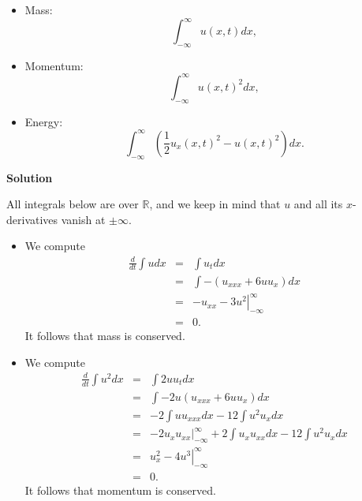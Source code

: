 \documentclass{article}
\begin{document}
\begin{enumerate}
\begin{itemize}
\item Mass:
\[\int_{-\infty}^{\infty} u(x,t) dx,\]

\item Momentum:
\[\int_{-\infty}^{\infty} u(x,t)^2 dx,\]

\item Energy:
\[\int_{-\infty}^{\infty} \left( \frac{1}{2} u_x(x,t)^2 - u(x,t)^2 \right) dx.\]

\end{itemize}

{\bf Solution}

All integrals below are over \(\mathbb{R}\), and we keep in mind that \(u\) and all its \(x\)-derivatives vanish at \(\pm \infty\).

\begin{itemize}
\item We compute
\begin{eqnarray*}
\frac{d}{dt} \int u dx
& = & \int u_t dx \\
& = & \int -\left( u_{xxx} + 6 u u_x \right) dx \\
& = & \left. -u_{xx} - 3 u^2 \right|_{-\infty}^{\infty} \\
& = & 0.
\end{eqnarray*}
It follows that mass is conserved.

\item We compute
\begin{eqnarray*}
\frac{d}{dt} \int u^2 dx
& = & \int 2 u u_t dx \\
& = & \int -2 u \left( u_{xxx} + 6 u u_x \right) dx \\
& = & -2 \int u u_{xxx} dx - 12 \int u^2 u_x dx \\
& = & \left. -2 u_x u_{xx} \right|_{-\infty}^{\infty} + 2 \int u_x u_{xx} dx - 12 \int u^2 u_x dx \\
& = & \left. u_x^2 - 4 u^3 \right|_{-\infty}^{\infty} \\
& = & 0.
\end{eqnarray*}
It follows that momentum is conserved.


\end{itemize}
\end{enumerate}
\end{document}
